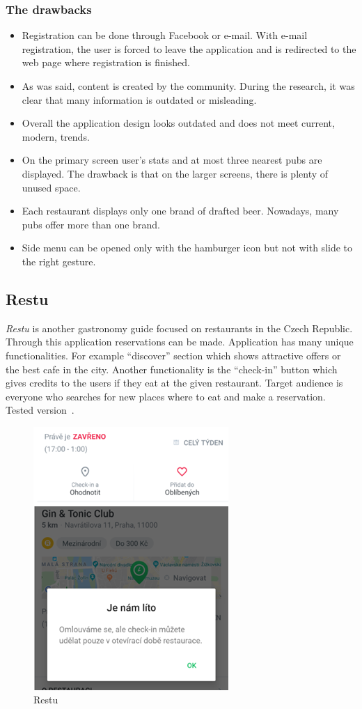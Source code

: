 \subsubsection{The drawbacks}
\begin{itemize}
    \item Registration can be done through Facebook or e-mail. With e-mail registration, the user is forced to leave the application and is redirected to the web page where registration is finished.
    \item As was said, content is created by the community. During the research, it was clear that many information is outdated or misleading. 
    \item Overall the application design looks outdated and does not meet current, modern,  trends.
    \item On the primary screen user's stats and at most three nearest pubs are displayed. The drawback is that on the larger screens, there is plenty of unused space. 
    \item Each restaurant displays only one brand of drafted beer. Nowadays, many pubs offer more than one brand. 
    \item Side menu can be opened only with the hamburger icon but not with slide to the right gesture.
\end{itemize}

\subsection{Restu}
\textit{Restu} is another gastronomy guide focused on restaurants in the Czech Republic. Through this application reservations can be made. Application has many unique functionalities. For example ``discover'' section which shows attractive offers or the best cafe in the city. Another functionality is the ``check-in'' button which gives credits to the users if they eat at the given restaurant. Target audience is everyone who searches for new places where to eat and make a reservation. Tested version~\cite{app-restu}.

\begin{figure}[ht]
    \centering
    \includegraphics[width=0.33\linewidth]{img/analysis/restu.png}
    \caption{Restu }
    \label{fig:restu}
\end{figure}

